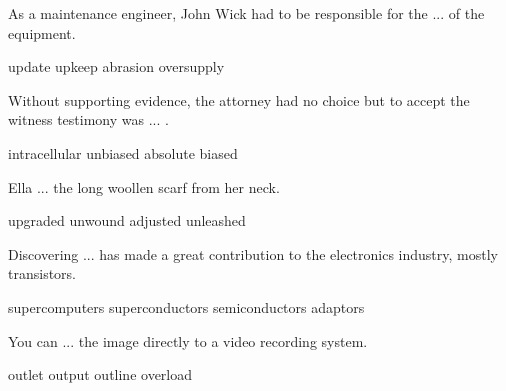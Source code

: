 \documentclass{exam}
\begin{document}
\begin{questions}
\question As a maintenance engineer, John Wick had to be responsible for the ... of the equipment.\\
\begin{oneparchoices}
\choice update 
\correctchoice upkeep
 \choice abrasion 
 \choice oversupply 
\end{oneparchoices}


\question Without supporting evidence, the attorney had no choice but to accept the witness testimony was ... .
\\
\begin{oneparchoices} 
\choice intracellular
 \choice unbiased
\correctchoice absolute
 \choice biased 
\end{oneparchoices}
\question Ella ... the long woollen scarf from her neck.\\
\begin{oneparchoices}
\choice upgraded
\correctchoice unwound
\choice adjusted
\choice unleashed
\end{oneparchoices}
\question Discovering ... has made a great contribution to the electronics industry, mostly transistors.\\
\begin{oneparchoices} 
\choice supercomputers
\choice superconductors
\correctchoice semiconductors
\choice adaptors
\end{oneparchoices}
\question You can ... the image directly to a video recording system.\\
\begin{oneparchoices}
\choice outlet
\correctchoice output
\choice outline
\choice overload
\end{oneparchoices}


\end{questions}
\end{document}
